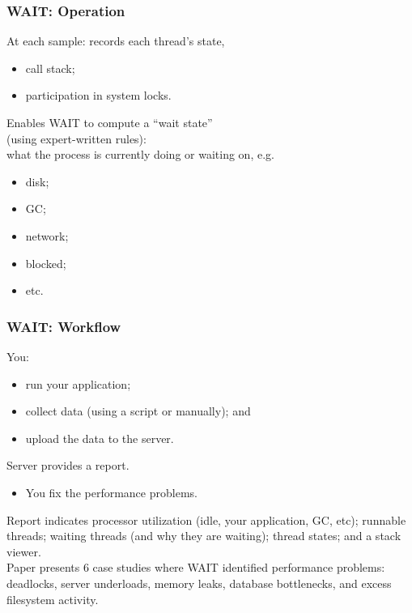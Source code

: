 
\begin{frame}
  \frametitle{WAIT: Operation}


\begin{changemargin}{1.5cm}

  At each sample: records each thread's state,
\begin{itemize}
\item call stack;
\item participation in system locks.
\end{itemize}

  Enables WAIT to compute a ``wait state'' \\(using expert-written rules): \\
what the process is currently doing or waiting on, e.g.
\begin{itemize}
\item disk;
\item GC;
\item network; 
\item blocked; 
\item etc.
\end{itemize}
\end{changemargin}

\end{frame}


\begin{frame}
  \frametitle{WAIT: Workflow}


\begin{changemargin}{1.5cm}

You:
\begin{itemize}
\item run your application;
\item collect data (using a script or manually); and 
\item upload the data to the server.
\end{itemize}
Server provides
a report.\\
\begin{itemize}
\item You fix the performance problems.\\[1em]
\end{itemize}

Report indicates processor utilization (idle, your application, GC, 
etc); runnable threads; waiting threads (and why they are waiting); 
thread states; and a stack viewer.\\[1em]

Paper presents 6 case studies where WAIT identified performance
problems: deadlocks, server underloads, memory leaks, database
bottlenecks, and excess filesystem activity.

\end{changemargin}
\end{frame}


